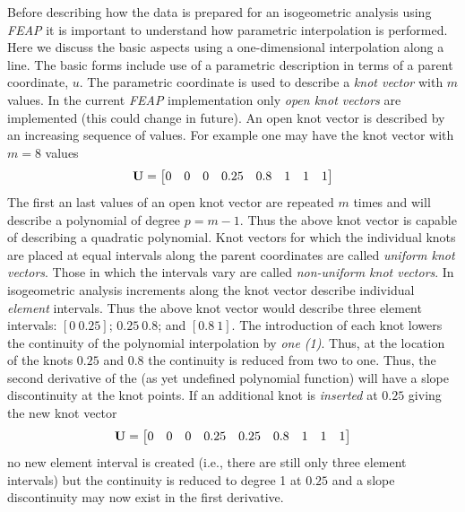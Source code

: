 Before describing how the data is prepared for an isogeometric
analysis using \textsl{FEAP} it is important to understand how
parametric interpolation is performed.  Here we discuss the basic
aspects using a one-dimensional interpolation along a line.  The basic
forms include use of a parametric description in terms of a parent
coordinate, $u$.  The parametric coordinate is used to describe a
\textit{knot vector} with $m$ values.
In the current \textsl{FEAP} implementation only
\textit{open knot vectors} are implemented (this could change in
future).  An open knot vector is described by an
increasing sequence of values. For example one may have the knot
vector with $m = 8$ values
\begin{displaymath}
\mathbf{U} = \begin{bmatrix} 0 & 0 & 0 & 0.25 & 0.8 & 1 & 1 & 1 \end{bmatrix}
\end{displaymath}
The first an last values of an open knot vector are repeated $m$ times
and will describe a polynomial of degree $p = m -1$.  Thus the above
knot vector is capable of describing a quadratic polynomial.
Knot vectors for which the individual knots are placed at equal
intervals along the parent coordinates are called \textit{uniform knot
vectors}.  Those in which the intervals vary are called
\textit{non-uniform knot vectors}.  In
isogeometric analysis increments along the knot vector describe
individual \textit{element} intervals.  Thus the above knot vector
would describe three element intervals: $[0 ~ 0.25]$; $0.25 ~ 0.8$; and
$[0.8 ~ 1]$.  The introduction of each knot lowers the continuity of the
polynomial interpolation by \textit{one (1)}. Thus, at the location of
the knots $0.25$ and $0.8$ the continuity is reduced from two to one.
Thus, the second derivative of the (as yet undefined polynomial function)
will have a slope discontinuity at the knot points.  If an additional
knot is \textit{inserted} at $0.25$ giving the new knot vector
\begin{displaymath}
\mathbf{U} = \begin{bmatrix} 0 & 0 & 0 & 0.25 & 0.25 & 0.8 & 1 & 1 & 1 \end{bmatrix}
\end{displaymath}
no new element interval is created (i.e., there are still only three
element intervals) but the continuity is reduced to degree 1 at $0.25$
and a slope discontinuity may now exist in the first derivative.

